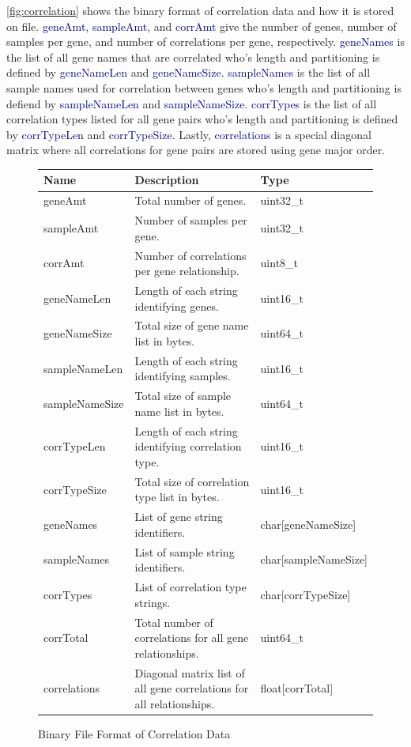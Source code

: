 \documentclass[10pt]{article}
\providecommand{\h}[1]{\textcolor{darkblue}{#1}}
\begin{document}
\autoref{fig:correlation} shows the binary format of correlation data and how 
it is stored on file. \h{geneAmt}, \h{sampleAmt}, and \h{corrAmt} give the 
number of genes, number of samples per gene, and number of correlations per 
gene, respectively. \h{geneNames} is the list of all gene names that are 
correlated who's length and partitioning is defined by \h{geneNameLen} and 
\h{geneNameSize}. \h{sampleNames} is the list of all sample names used for 
correlation between genes who's length and partitioning is defiend by 
\h{sampleNameLen} and \h{sampleNameSize}. \h{corrTypes} is the list of all 
correlation types listed for all gene pairs who's length and partitioning is 
defined by \h{corrTypeLen} and \h{corrTypeSize}. Lastly, \h{correlations} is a 
special diagonal matrix where all correlations for gene pairs are stored using 
gene major order.

\begin{figure}[H]
\begin{mdframed}[style=btable]
\begin{tabularx}{\textwidth}{|l|X|l|}
\hline
\textbf{Name} & \textbf{Description} & \textbf{Type} \\
\hline
geneAmt & Total number of genes. & uint32\_t \\
\hline
sampleAmt & Number of samples per gene. & uint32\_t \\
\hline
corrAmt & Number of correlations per gene relationship. & uint8\_t \\
\hline
geneNameLen & Length of each string identifying genes. & uint16\_t \\
\hline
geneNameSize & Total size of gene name list in bytes. & uint64\_t \\
\hline
sampleNameLen & Length of each string identifying samples. & uint16\_t \\
\hline
sampleNameSize & Total size of sample name list in bytes. & uint64\_t \\
\hline
corrTypeLen & Length of each string identifying correlation type. & uint16\_t \\
\hline
corrTypeSize & Total size of correlation type list in bytes. & uint16\_t \\
\hline
geneNames & List of gene string identifiers. & char[geneNameSize] \\
\hline
sampleNames & List of sample string identifiers. & char[sampleNameSize] \\
\hline
corrTypes & List of correlation type strings. & char[corrTypeSize] \\
\hline
corrTotal & Total number of correlations for all gene relationships. & 
uint64\_t \\
\hline
correlations & Diagonal matrix list of all gene correlations for all 
relationships. & float[corrTotal] \\
\hline
\end{tabularx}
\end{mdframed}
\caption{Binary File Format of Correlation Data}
\label{fig:correlation}
\end{figure}
\end{document}
